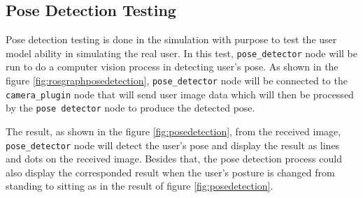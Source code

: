 \subsection{Pose Detection Testing}
\label{subsec:posedetectiontesting}



Pose detection testing is done in the simulation with purpose to test the user model ability in simulating the real user.
In this test,
  \lstinline{pose_detector} node will be run to do a computer vision process in detecting user's pose.
As shown in the figure \ref{fig:rosgraphposedetection},
  \lstinline{pose_detector} node will be connected to the \lstinline{camera_plugin} node that will send user image data which will then be processed by the \lstinline{pose detector} node to produce the detected pose.



The result,
  as shown in the figure \ref{fig:posedetection},
  from the received image,
  \lstinline{pose_detector} node will detect the user's pose and display the result as lines and dots on the received image.
Besides that,
  the pose detection process could also display the corresponded result when the user's posture is changed from standing to sitting as in the result of figure \ref{fig:posedetection}.
